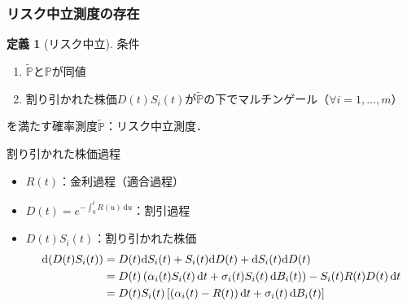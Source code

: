 \documentclass[a4paper, lualatex, ja=standard]{bxjsarticle}
\theoremstyle{definition}
\newtheorem{dfn}[thm]{定義}
\renewcommand{\P}{\mathbb{P}}
\newcommand{\PP}{\widetilde{\mathbb{P}}}
\newcommand{\diff}{\mathrm{d}}
\begin{document}
\subsubsection{リスク中立測度の存在}
\begin{dfn}[リスク中立]
  条件
  \begin{enumerate}
    \item $\PP$と$\P$が同値
    \item 割り引かれた株価$D(t)S_i(t)$が$\PP$の下でマルチンゲール（$\forall i=1,\ldots,m$）
  \end{enumerate}
  を満たす確率測度$\PP$：リスク中立測度．
\end{dfn}
割り引かれた株価過程
\begin{itemize}
  \item $R(t)$：金利過程（適合過程）
  \item $D(t) = e^{-\int_0^t R(u)\,\diff u}$：割引過程
  \item $D(t)S_i(t)$：割り引かれた株価
  \setcounter{equation}{14}
  \begin{align}
    \diff(D(t)S_i(t)) &= D(t)\diff S_i(t)+S_i(t)\diff D(t)+\diff S_i(t)\diff D(t)\notag\\
    &= D(t)\left(\alpha_i(t)S_i(t)\,\diff t+\sigma_i(t)S_i(t)\,\diff B_i(t)\right)-S_i(t)R(t)D(t)\,\diff t\notag\\
    &= D(t)S_i(t)\left[(\alpha_i(t)-R(t))\,\diff t+\sigma_i(t)\,\diff B_i(t)\right]
  \end{align}
\end{itemize}
\end{document}
